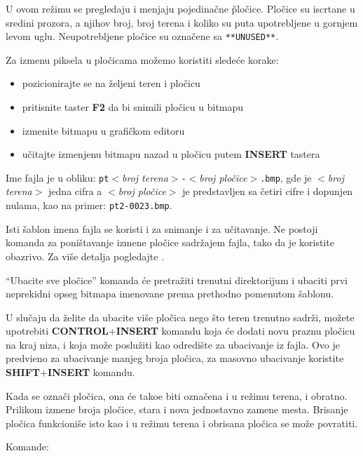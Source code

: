 \documentclass[a4paper,12pt]{article}
\begin{document}
U ovom re\v zimu se pregledaju i menjaju pojedina\v cne \v plo\v cice. Plo\v cice su iscrtane u sredini prozora, a
njihov broj, broj terena i koliko su puta upotrebljene u gornjem levom uglu. Neupotrebljene plo\v cice su
ozna\v cene sa \verb|**UNUSED**|.

Za izmenu piksela u plo\v cicama mo\v zemo koristiti slede\'ce korake:
\begin{itemize}[noitemsep]
\item pozicionirajte se na \v zeljeni teren i plo\v cicu
\item pritisnite taster {\bf F2} da bi snimili plo\v cicu u bitmapu
\item izmenite bitmapu u grafi\v ckom editoru
\item u\v citajte izmenjenu bitmapu nazad u plo\v cicu putem {\bf INSERT} tastera
\end{itemize}

Ime fajla je u obliku: \verb|pt|$<${\it broj terena}$>$\verb|-|$<${\it broj plo\v cice}$>$\verb|.bmp|,
gde je $<${\it broj terena}$>$ jedna cifra a $<${\it broj plo\v cice}$>$ je predstavljen sa \v cetiri cifre i dopunjen nulama, kao na primer: \verb|pt2-0023.bmp|.

Isti \v sablon imena fajla se koristi i za snimanje i za u\v citavanje. Ne postoji komanda za poni\v stavanje
izmene plo\v cice sadr\v zajem fajla, tako da je koristite obazrivo. Za vi\v se detalja pogledajte
.

``Ubacite sve plo\v cice'' komanda \'ce pretra\v ziti trenutni direktorijum i ubaciti prvi neprekidni opseg
bitmapa imenovane prema prethodno pomenutom \v sablonu.

U slu\v caju da \v zelite da ubacite vi\v se plo\v cica nego \v sto teren trenutno sadr\v zi, mo\v zete upotrebiti
{\bf CONTROL}+{\bf INSERT} komandu koja \'ce dodati novu praznu plo\v cicu na kraj niza, i koja mo\v ze
poslu\v ziti kao odredi\v ste za ubacivanje iz fajla. Ovo je predvi\dj eno za ubacivanje manjeg broja plo\v cica,
za masovno ubacivanje koristite {\bf SHIFT}+{\bf INSERT} komandu.

Kada se ozna\v ci plo\v cica, ona \'ce tako\dj e biti ozna\v cena i u re\v zimu terena, i obratno. Prilikom izmene
broja plo\v cice, stara i nova jednostavno zamene mesta. Brisanje plo\v cica funkcioni\v se isto kao i u re\v zimu
terena i obrisana plo\v cica se mo\v ze povratiti.

\vspace{\baselineskip}

\noindent Komande:
\end{document}
